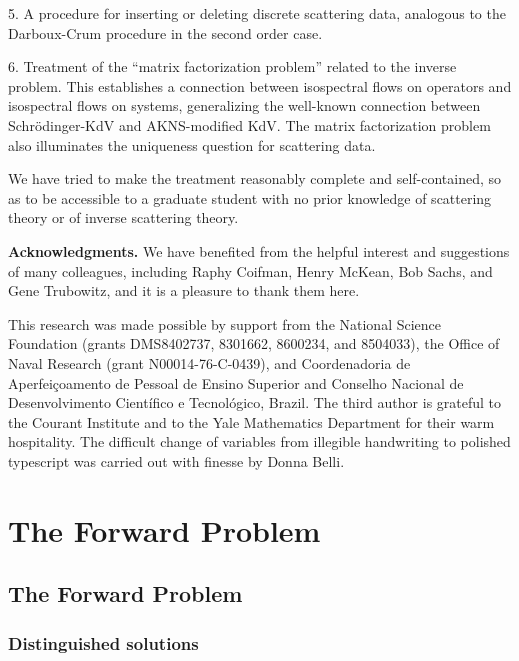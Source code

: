 \documentclass{surv-l}
\theoremstyle{plain}
\theoremstyle{definition}
\numberwithin{equation}{chapter}
\begin{document}
5. A procedure for inserting or deleting discrete scattering data, analogous to the Darboux-Crum procedure in the second order case.

6. Treatment of the ``matrix factorization problem'' related to the inverse problem. This establishes a connection between isospectral flows on operators and isospectral flows on systems, generalizing the well-known connection between Schr\"{o}dinger-KdV and AKNS-modified KdV. The matrix factorization problem also illuminates the uniqueness question for scattering data.

We have tried to make the treatment reasonably complete and self-contained, so as to be accessible to a graduate student with no prior knowledge of scattering theory or of inverse scattering theory.

\textbf{Acknowledgments.} We have benefited from the helpful interest and suggestions of many colleagues, including Raphy Coifman, Henry McKean, Bob Sachs, and Gene Trubowitz, and it is a pleasure to thank them here.

This research was made possible by support from the National Science Foundation (grants DMS8402737, 8301662, 8600234, and 8504033), the Office of Naval Research (grant N00014-76-C-0439), and Coordenadoria de Aperfei\c{c}oamento de Pessoal de Ensino Superior and Conselho Nacional de Desenvolvimento Cient\'{i}fico e Tecnol\'{o}gico, Brazil. The third author is grateful to the Courant Institute and to the Yale Mathematics Department for their warm hospitality. The difficult change of variables from illegible handwriting to polished typescript was carried out with finesse by Donna Belli.

\renewcommand{\thepart}{\Roman{part}}
\renewcommand{\thesection}{\arabic{section}}

\setcounter{part}{0}
\part{The Forward Problem}\label{partI}

\def\chaptername{Part}
\def\thechapter{\Roman{chapter}}

\chapter{The Forward Problem}

\setcounter{section}{0}
\section[Distinguished Solutions]{Distinguished solutions}
\end{document}
